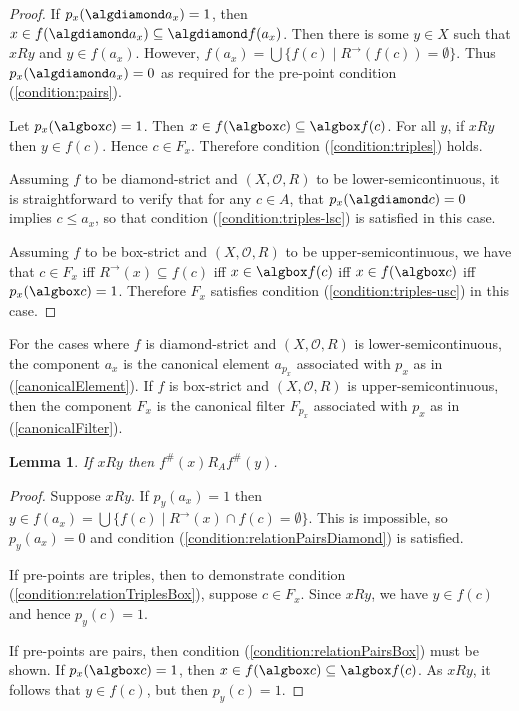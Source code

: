 \documentclass{article}[a4paper]
\newtheorem{lemma}{Lemma}%
\theoremstyle{definition}
\newcommand{\Ocal}{\mathcal{O}} %
\newcommand{\relsp}{\mathbf{RelSp}}
\newcommand{\mfrm}{\mathbf{MFrm}}
\newcommand{\dirim}{^{\rightarrow\!}}
\begin{document}
\begin{proof}
    If $p_x (\algdiamond a_x) = 1$, then $x \in f(\algdiamond a_x) \subseteq \algdiamond f(a_x)$. Then there is some $y \in X$ such that $xRy$ and $y \in f(a_x)$. However,  $f(a_x) = \bigcup \{f(c) \mid R\dirim (f(c)) = \emptyset \}$. 
    Thus $p_x (\algdiamond a_x) = 0$ as required for the pre-point condition (\ref{condition:pairs}).

    Let $p_x(\algbox c)=1$. Then $x \in f(\algbox c) \subseteq \algbox f(c)$. For all $y$, if $xRy$ then $y \in f(c)$. Hence $c \in F_x$. 
    Therefore condition (\ref{condition:triples}) holds.

    Assuming $f$ to be diamond-strict and $(X,\Ocal, R)$ to be lower-semicontinuous, it is straightforward to verify that for any $c \in A$, that  
    $p_x (\algdiamond c) = 0$ implies $c \leq a_x$, so that condition (\ref{condition:triples-lsc}) is satisfied in this case.

    Assuming $f$ to be box-strict and $(X,\Ocal, R)$ to be upper-semicontinuous, we have that $c \in F_x$ iff $R\dirim (x) \subseteq f(c)$ iff $x \in \algbox f(c)$ iff $x \in f(\algbox c)$ iff $p_x (\algbox c) =1$. Therefore $F_x$ satisfies condition (\ref{condition:triples-usc}) in this case.
\end{proof}

For the cases where $f$ is diamond-strict and $(X, \Ocal ,R)$ is lower-semicontinuous, the component $a_x$ is the canonical element $a_{p_x}$ associated with $p_x$ as in (\ref{canonicalElement}). If $f$ is box-strict and $(X, \Ocal ,R)$ is upper-semicontinuous, then the component $F_x$ is the canonical filter $F_{p_x}$ associated with $p_x$ as in (\ref{canonicalFilter}). 

\begin{lemma}
\label{result:fHashRelPres}
If $xRy$ then $f^{\#}(x) R_A f^{\#}(y)$.
\end{lemma}

\begin{proof}
Suppose $xRy$. 
If $p_y(a_x)=1$ then 
$y \in f(a_x) = 
        \bigcup \{ f(c) \mid R\dirim (x) \cap f(c) = \emptyset \}$. 
This is impossible, so $p_y(a_x)=0$ and condition (\ref{condition:relationPairsDiamond}) is satisfied. 

If pre-points are triples, then to  demonstrate condition (\ref{condition:relationTriplesBox}), suppose $c \in F_x$. Since $xR y$, we have $y \in f(c)$ and 
hence $p_y(c)=1$. 

If pre-points are pairs, then condition (\ref{condition:relationPairsBox}) must be shown. If $p_x (\algbox c) =1$, then $x\in f(\algbox c) \subseteq \algbox f(c)$. As $xRy$, it follows that $y \in f(c)$, but then $p_y(c)=1$.
\end{proof}
\end{document}
